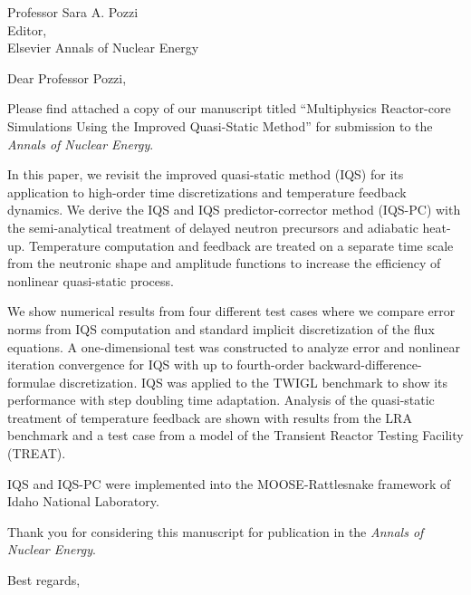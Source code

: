 \begin{letter}{Professor Sara A. Pozzi\\
    Editor,\\
    Elsevier Annals of Nuclear Energy}
\date{\today}

\opening{Dear Professor Pozzi,}
         \vspace{0.25cm}

Please find attached a copy of our manuscript titled ``Multiphysics Reactor-core Simulations Using the Improved Quasi-Static Method'' for submission to the {\em Annals of Nuclear Energy}. 

In this paper, we revisit the improved quasi-static method (IQS) for its application to high-order time discretizations and temperature feedback dynamics. We derive the IQS and IQS predictor-corrector method (IQS-PC) with the semi-analytical treatment of delayed neutron precursors and adiabatic heat-up. Temperature computation and feedback are treated on a separate time scale from the neutronic shape and amplitude functions to increase the efficiency of nonlinear quasi-static process.

We show numerical results from four different test cases where we compare error norms from IQS computation and standard implicit discretization of the flux equations. A one-dimensional test was constructed to analyze error and nonlinear iteration convergence for IQS with up to fourth-order backward-difference-formulae discretization. IQS was applied to the TWIGL benchmark to show its performance with step doubling time adaptation. Analysis of the quasi-static treatment of temperature feedback are shown with results from the LRA benchmark and a test case from a model of the Transient Reactor Testing Facility (TREAT). 

IQS and IQS-PC were implemented into the MOOSE-Rattlesnake framework of Idaho National Laboratory.

Thank you for considering this manuscript for publication in the {\it Annals of Nuclear Energy}.

\vspace{0.25cm}



\closing{Best regards, }

\end{letter}


